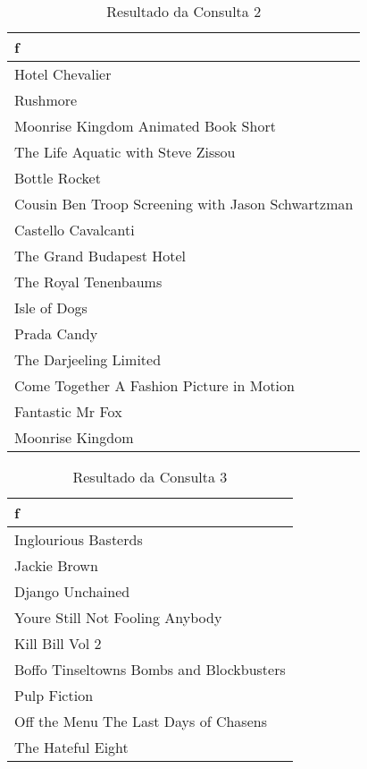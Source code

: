 \documentclass{article}
\begin{document}
\begin{table}[htbp]
\begin{center}
\begin{tabular}{l}

\textbf{f} \\ 
\midrule
Hotel Chevalier \\ 
Rushmore \\ 
Moonrise Kingdom Animated Book Short \\ 
The Life Aquatic with Steve Zissou \\ 
Bottle Rocket \\ 
Cousin Ben Troop Screening with Jason Schwartzman \\ 
Castello Cavalcanti \\ 
The Grand Budapest Hotel \\ 
The Royal Tenenbaums \\ 
Isle of Dogs \\ 
Prada Candy \\ 
The Darjeeling Limited \\ 
Come Together A Fashion Picture in Motion \\ 
Fantastic Mr Fox \\ 
Moonrise Kingdom \\ 
\end{tabular}
\end{center}
\caption{Resultado da Consulta 2}
\end{table}

\begin{table}[htbp]
\begin{center}
\begin{tabular}{l}

\textbf{f} \\ 
\midrule
Inglourious Basterds \\ 
Jackie Brown \\ 
Django Unchained \\ 
Youre Still Not Fooling Anybody \\ 
Kill Bill Vol 2 \\ 
Boffo Tinseltowns Bombs and Blockbusters \\ 
Pulp Fiction \\ 
Off the Menu The Last Days of Chasens \\ 
The Hateful Eight \\ 
\end{tabular}
\end{center}
\caption{Resultado da Consulta 3}

\end{table}
\end{document}
